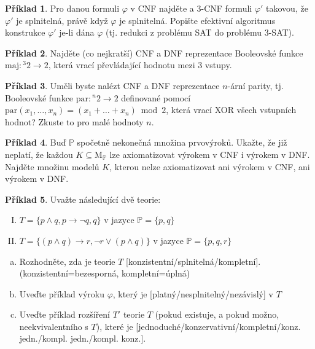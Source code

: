 \documentclass[a4paper]{article}
\theoremstyle{definition}
\newtheorem{problem}{Příklad}
\begin{document}
    
\medskip\begin{problem} Pro danou formuli $\varphi$ v CNF najděte a 3-CNF formuli $\varphi'$ takovou, že $\varphi'$ je splnitelná, právě když $\varphi$ je splnitelná. Popište efektivní algoritmus konstrukce $\varphi'$ je-li dána $\varphi$ (tj. redukci z problému SAT do problému 3-SAT).
\end{problem}
    
    
\medskip\begin{problem} Najděte (co nejkratší) CNF a DNF reprezentace Booleovské funkce $\mathrm{maj}: {^3}2\to 2$, která vrací převládající hodnotu mezi 3 vstupy.
\end{problem}
    
    
\medskip\begin{problem} Uměli byste nalézt CNF a DNF reprezentace $n$-ární parity, tj. Booleovské funkce $\mathrm{par}: {^n}2\to 2$ definované pomocí $\mathrm{par}(x_1,\dots,x_n)=(x_1+\dots+x_n)\bmod 2$,
která vrací XOR všech vstupních hodnot? Zkuste to pro malé hodnoty $n$.
\end{problem}
    
    
\medskip\begin{problem} Buď $\mathbb P$ spočetně nekonečná množina prvovýroků. Ukažte, že již neplatí, že každou $K\subseteq \mathrm{M}_\mathbb P$ lze axiomatizovat výrokem v CNF i výrokem v DNF. Najděte množinu modelů $K$, kterou nelze axiomatizovat ani výrokem v CNF, ani výrokem v DNF.
\end{problem}


\medskip\begin{problem}
Uvažte následující dvě teorie:
\begin{enumerate}[(I)]
    \item $T=\{p\wedge q,p\to\neg q,q\}$ v jazyce $\mathbb P=\{p,q\}$
    \item $T=\{(p\wedge q)\to r, \neg r\vee(p\wedge q)\}$ v jazyce $\mathbb P=\{p,q,r\}$        
\end{enumerate}
\begin{enumerate}[(a)]
    \item Rozhodněte, zda je teorie $T$ [konzistentní/splnitelná/kompletní]. (konzistentní=bezesporná, kompletní=úplná)
    \item Uveďte příklad výroku $\varphi$, který je [platný/nesplnitelný/nezávislý] v $T$
    \item Uveďte příklad rozšíření $T'$ teorie $T$ (pokud existuje, a pokud možno, neekvivalentního s $T$), které je [jednoduché/konzervativní/kompletní/konz. jedn./kompl. jedn./kompl. konz.].
\end{enumerate}

\end{problem}
        
\end{document}
